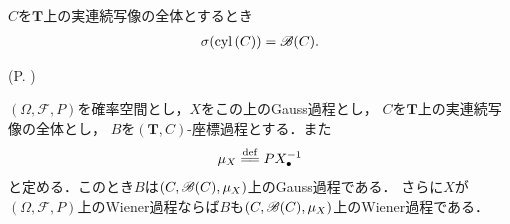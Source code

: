 	\begin{screen}
		\begin{thm}[連続写像の全体の筒集合族はBorel集合族を生成する]
			$C$を$\mathbf{T}$上の実連続写像の全体とするとき
			\begin{align}
				\sigma(\operatorname{cyl}\left(C\right)) = \mathscr{B}(C).
			\end{align}
		\end{thm}
	\end{screen}
	
	\begin{sketch}
		(P. \pageref{chapter_2_problem_4_2})
	\end{sketch}
	
	\begin{screen}
		\begin{thm}\label{thm:Wiener_process_on_continuous_functions}
			$(\Omega,\mathscr{F},P)$を確率空間とし，$X$をこの上のGauss過程とし，
			$C$を$\mathbf{T}$上の実連続写像の全体とし，
			$B$を$(\mathbf{T},C)$-座標過程とする．また
			\begin{align}
				\mu_X \defeq P X_\bullet^{-1}
			\end{align}
			と定める．このとき$B$は$(C,\mathscr{B}(C),\mu_X)$上のGauss過程である．
			さらに$X$が$(\Omega,\mathscr{F},P)$上のWiener過程ならば$B$も$(C,\mathscr{B}(C),\mu_X)$上のWiener過程である．
		\end{thm}
	\end{screen}
	
